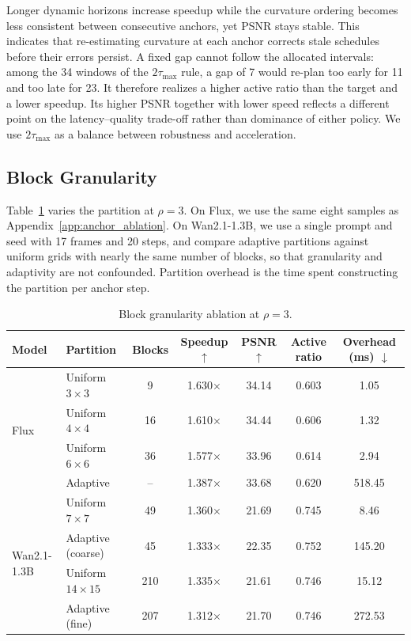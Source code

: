 Longer dynamic horizons increase speedup while the curvature ordering becomes less consistent between consecutive anchors, yet PSNR stays stable. This indicates that re-estimating curvature at each anchor corrects stale schedules before their errors persist. A fixed gap cannot follow the allocated intervals: among the 34 windows of the $2\tau_{\max}$ rule, a gap of 7 would re-plan too early for 11 and too late for 23. It therefore realizes a higher active ratio than the target and a lower speedup. Its higher PSNR together with lower speed reflects a different point on the latency--quality trade-off rather than dominance of either policy. We use $2\tau_{\max}$ as a balance between robustness and acceleration.

\subsection{Block Granularity}
\label{app:granularity}
Table~\ref{tab:granularity} varies the partition at $\rho=3$. On Flux, we use the same eight samples as Appendix~\ref{app:anchor_ablation}. On Wan2.1-1.3B, we use a single prompt and seed with 17 frames and 20 steps, and compare adaptive partitions against uniform grids with nearly the same number of blocks, so that granularity and adaptivity are not confounded. Partition overhead is the time spent constructing the partition per anchor step.

\begin{table}[h]
\centering
\caption{Block granularity ablation at $\rho=3$.}
\label{tab:granularity}
\small
\begin{tabular}{llccccc}
\toprule
Model & Partition & Blocks & Speedup $\uparrow$ & PSNR $\uparrow$ & Active ratio & Overhead (ms) $\downarrow$ \\
\midrule
\multirow{4}{*}{Flux} & Uniform $3\times3$ & 9 & 1.630$\times$ & 34.14 & 0.603 & 1.05 \\
 & Uniform $4\times4$ & 16 & 1.610$\times$ & 34.44 & 0.606 & 1.32 \\
 & Uniform $6\times6$ & 36 & 1.577$\times$ & 33.96 & 0.614 & 2.94 \\
 & Adaptive & -- & 1.387$\times$ & 33.68 & 0.620 & 518.45 \\
\midrule
\multirow{4}{*}{Wan2.1-1.3B} & Uniform $7\times7$ & 49 & 1.360$\times$ & 21.69 & 0.745 & 8.46 \\
 & Adaptive (coarse) & 45 & 1.333$\times$ & 22.35 & 0.752 & 145.20 \\
 & Uniform $14\times15$ & 210 & 1.335$\times$ & 21.61 & 0.746 & 15.12 \\
 & Adaptive (fine) & 207 & 1.312$\times$ & 21.70 & 0.746 & 272.53 \\
\bottomrule
\end{tabular}
\end{table}


